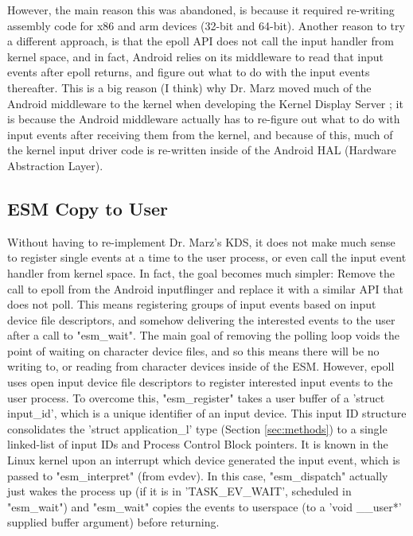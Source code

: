 \documentclass[10pt,journal,compsoc]{IEEEtran}
\begin{document}
However, the main reason this was abandoned, is because it required re-writing assembly code for x86 and arm devices (32-bit and 64-bit). Another reason to try a different approach, is that the epoll API does not call the input handler from kernel space, and in fact, Android relies on its middleware to read that input events after epoll returns, and figure out what to do with the input events thereafter. This is a big reason (I think) why Dr. Marz moved much of the Android middleware to the kernel when developing the Kernel Display Server \cite{8413093}; it is because the Android middleware actually has to re-figure out what to do with input events after receiving them from the kernel, and because of this, much of the kernel input driver code is re-written inside of the Android HAL (Hardware Abstraction Layer).

\subsection{ESM Copy to User}
\label{sec:copytouser}
Without having to re-implement Dr. Marz's KDS, it does not make much sense to register single events at a time to the user process, or even call the input event handler from kernel space. In fact, the goal becomes much simpler: Remove the call to epoll from the Android inputflinger and replace it with a similar API that does not poll. This means registering groups of input events based on input device file descriptors, and somehow delivering the interested events to the user after a call to "esm\_wait". The main goal of removing the polling loop voids the point of waiting on character device files, and so this means there will be no writing to, or reading from character devices inside of the ESM. However, epoll uses open input device file descriptors to register interested input events to the user process. To overcome this, "esm\_register" takes a user buffer of a 'struct input\_id', which is a unique identifier of an input device. This input ID structure consolidates the 'struct application\_l' type (Section \ref{sec:methods}) to a single linked-list of input IDs and Process Control Block pointers. It is known in the Linux kernel upon an interrupt which device generated the input event, which is passed to "esm\_interpret" (from evdev). In this case, "esm\_dispatch" actually just wakes the process up (if it is in 'TASK\_EV\_WAIT', scheduled in "esm\_wait") and "esm\_wait" copies the events to userspace (to a 'void \_\_user*' supplied buffer argument) before returning. 
\end{document}
